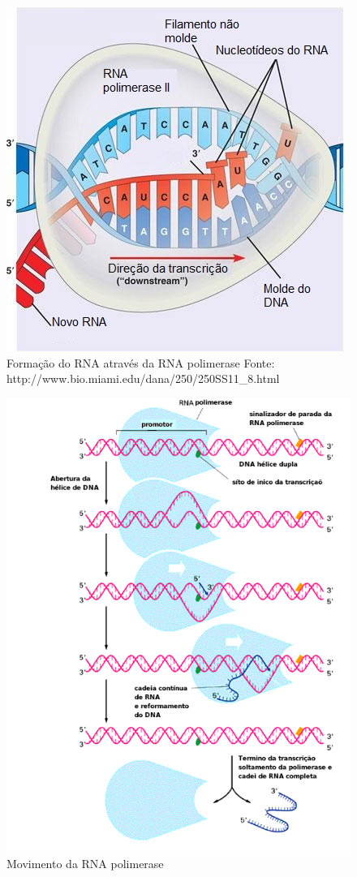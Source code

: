 \begin{figure}[H]
    \centering
    \includegraphics[scale=0.7]{./figuras/RNA-polimerase.jpg}
    \caption{Formação do RNA através da RNA polimerase Fonte: http://www.bio.miami.edu/dana/250/250SS11\_8.html}
    \label{fig:Rnapolimerase}
\end{figure}

\begin{figure}[H]
    \centering
    \includegraphics[scale=0.7]{./figuras/RNAPOLII.png}
    \caption{Movimento da RNA polimerase \cite[Adaptada]{Higgs2005}}
    \label{fig:RNAPOLII}
\end{figure}

